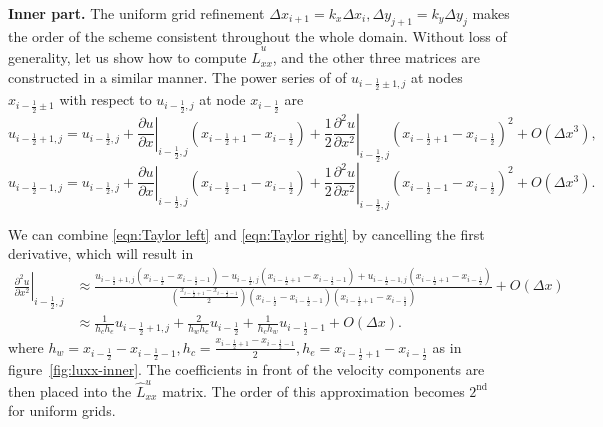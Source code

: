 \documentclass{article}
\begin{document}
\textbf{Inner part.}
The uniform grid refinement $\Delta x_{i+1}=k_x\Delta x_i,\Delta y_{j+1}=k_y\Delta y_j$ makes the order of the scheme consistent throughout the whole domain. Without loss of generality, let us show how to compute $\hat{L}^u_{xx}$, and the other three matrices are constructed in a similar manner. The power series of of $u_{i-\frac{1}{2}\pm 1,j}$ at nodes $x_{i - \frac{1}{2}\pm 1}$ with respect to $u_{i - \frac{1}{2},j}$ at node $x_{i-\frac{1}{2}}$ are
\begin{equation}\label{eqn:Taylor right} 
	u_{i-\frac{1}{2}+1,j}=u_{i-\frac{1}{2},j}+\left.\frac{\partial u}{\partial x}\right|_{i-\frac{1}{2},j}\left(x_{i-\frac{1}{2}+1}-x_{i-\frac{1}{2}}\right)+\frac{1}{2}\left.\frac{\partial^2 u}{\partial x^2}\right|_{i-\frac{1}{2},j}\left(x_{i-\frac{1}{2}+1}-x_{i-\frac{1}{2}}\right)^2+O\left(\Delta x^3\right),
\end{equation}
\begin{equation}\label{eqn:Taylor left} 
	u_{i-\frac{1}{2}-1,j}=u_{i-\frac{1}{2},j}+\left.\frac{\partial u}{\partial x}\right|_{i-\frac{1}{2},j}\left(x_{i-\frac{1}{2}-1}-x_{i-\frac{1}{2}}\right)+\frac{1}{2}\left.\frac{\partial^2 u}{\partial x^2}\right|_{i-\frac{1}{2},j}\left(x_{i-\frac{1}{2}-1}-x_{i-\frac{1}{2}}\right)^2+O\left(\Delta x^3\right).
\end{equation}

We can combine \eqref{eqn:Taylor left} and \eqref{eqn:Taylor right} by cancelling the first derivative, which will result in
\begin{align}\label{eqn:laplacian-discretization-non-uniform-dx}
\left.\frac{\partial^2 u}{\partial x^2}\right|_{i-\frac{1}{2},j} & \approx \frac{u_{i-\frac{1}{2}+1,j}\left(x_{i-\frac{1}{2}}-x_{i-\frac{1}{2}-1}\right)-u_{i-\frac{1}{2},j}\left(x_{i-\frac{1}{2}+1}-x_{i-\frac{1}{2}-1}\right)+u_{i-\frac{1}{2}-1,j}\left(x_{i-\frac{1}{2}+1}-x_{i-\frac{1}{2}}\right)}{\left(\frac{x_{i-\frac{1}{2}+1}-x_{i-\frac{1}{2}-1}}{2}\right)\left(x_{i-\frac{1}{2}}-x_{i-\frac{1}{2}-1}\right)\left(x_{i-\frac{1}{2}+1}-x_{i-\frac{1}{2}}\right)}+O(\Delta x)\\
& \approx \frac{1}{h_c h_e}u_{i-\frac{1}{2}+1,j} + \frac{2}{h_w h_e}u_{i-\frac{1}{2}} + \frac{1}{h_c h_w}u_{i-\frac{1}{2}-1} + O(\Delta x).
\end{align}
where $h_w=x_{i-\frac{1}{2}}-x_{i-\frac{1}{2}-1},h_c = \frac{x_{i-\frac{1}{2}+1}-x_{i-\frac{1}{2}-1}}{2}, h_e = x_{i-\frac{1}{2}+1}-x_{i-\frac{1}{2}}$ as in figure~\ref{fig:luxx-inner}. The coefficients in front of the velocity components are then placed into the $\hat{L}^u_{xx}$ matrix. The order of this approximation becomes $2^{\text {nd }}$ for uniform grids. 
\end{document}
